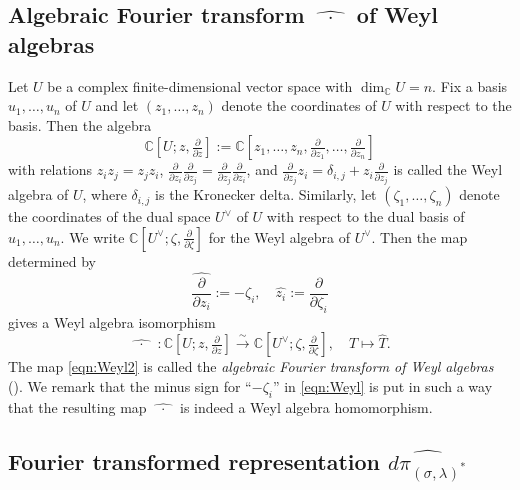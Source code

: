 \documentclass[reqno,11pt]{amsart}
\theoremstyle{remark}
\theoremstyle{definition}
\numberwithin{equation}{section}
\newcommand{\C}{\mathbb{C}}
\newcommand{\To}{\longrightarrow}
\begin{document}
\subsection{Algebraic Fourier transform $\widehat{\;\;\cdot\;\;}$ of Weyl algebras}
\label{sec:Weyl}

Let $U$ be a complex finite-dimensional vector space with $\dim _\C U=n$.
Fix a basis $u_1,\ldots, u_n$ of $U$ and let 
$(z_1, \ldots, z_n)$ denote the coordinates of $U$ with respect to the basis.
Then the algebra
\begin{equation*}
\C[U;z, \tfrac{\partial}{\partial z}]:=
\C[z_1, \ldots, z_n, 
\tfrac{\partial}{\partial z_1}, \ldots, \tfrac{\partial}{\partial z_n}]
\end{equation*}
with relations $z_iz_j = z_jz_i$, 
$\frac{\partial}{\partial z_i}\frac{\partial}{\partial z_j} 
=\frac{\partial}{\partial z_j}\frac{\partial}{\partial z_i}$,
and $\frac{\partial}{\partial z_j} z_i=\delta_{i,j} + z_i \frac{\partial}{\partial z_j}$
is called the Weyl algebra of $U$, where $\delta_{i,j}$ is the Kronecker delta.
Similarly,
let $(\zeta_1,\ldots, \zeta_n)$ denote the coordinates of 
the dual space $U^\vee$ of $U$ with respect to the dual basis of 
$u_1,\ldots, u_n$. We write 
$\C[U^\vee;\zeta, \tfrac{\partial}{\partial \zeta}]$
for the Weyl algebra of $U^\vee$.
Then the map determined by
\begin{equation}\label{eqn:Weyl}
\widehat{\frac{\partial}{\partial z_i}}:= -\zeta_i, \quad
\widehat{z_i}:=\frac{\partial}{\partial \zeta_i}
\end{equation}
gives a Weyl algebra isomorphism 
\begin{equation}\label{eqn:Weyl2}
\widehat{\;\;\cdot\;\;}\;\colon\C[U;z, \tfrac{\partial}{\partial z}] 
\stackrel{\sim}{\To} 
\C[U^\vee;\zeta, \tfrac{\partial}{\partial \zeta}], 
\quad T \mapsto \widehat{T}.
\end{equation}
\vskip 0.1in
\noindent
The map \eqref{eqn:Weyl2} is called
the \emph{algebraic Fourier transform of Weyl algebras}
(\cite[Def.\ 3.1]{KP1}). We remark that the minus sign for ``$-\zeta_i$'' 
in \eqref{eqn:Weyl} is put in such a way that the resulting map $\widehat{\;\;\cdot\;\;}$ 
is indeed a Weyl algebra homomorphism.

\subsection{Fourier transformed representation $\widehat{d\pi_{(\sigma,\lambda)^*}}$}
\label{sec:dpi2}
\end{document}
